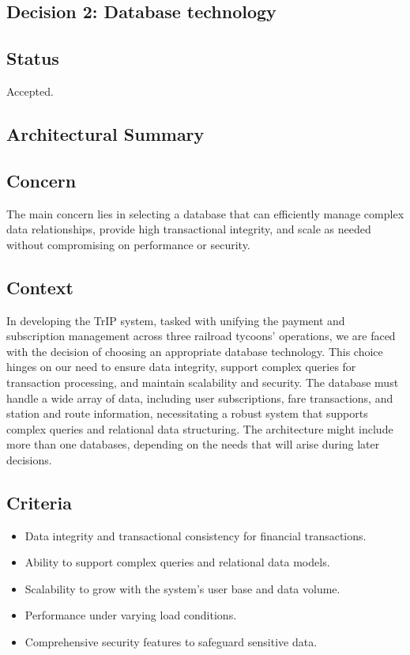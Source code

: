 \subsection{Decision 2: Database technology}

\subsection*{Status}
Accepted.

\subsection*{Architectural Summary}

\subsection*{Concern}
The main concern lies in selecting a database that can efficiently manage complex data relationships, provide high transactional integrity, and scale as needed without compromising on performance or security.

\subsection*{Context}
In developing the TrIP system, tasked with unifying the payment and subscription management across three railroad tycoons' operations, we are faced with the decision of choosing an appropriate database technology. This choice hinges on our need to ensure data integrity, support complex queries for transaction processing, and maintain scalability and security.
The database must handle a wide array of data, including user subscriptions, fare transactions, and station and route information, necessitating a robust system that supports complex queries and relational data structuring.
The architecture might include more than one databases, depending on the needs that will arise during later decisions.

\subsection*{Criteria}
\begin{itemize}
    \item Data integrity and transactional consistency for financial transactions.
    \item Ability to support complex queries and relational data models.
    \item Scalability to grow with the system's user base and data volume.
    \item Performance under varying load conditions.
    \item Comprehensive security features to safeguard sensitive data.
\end{itemize}

